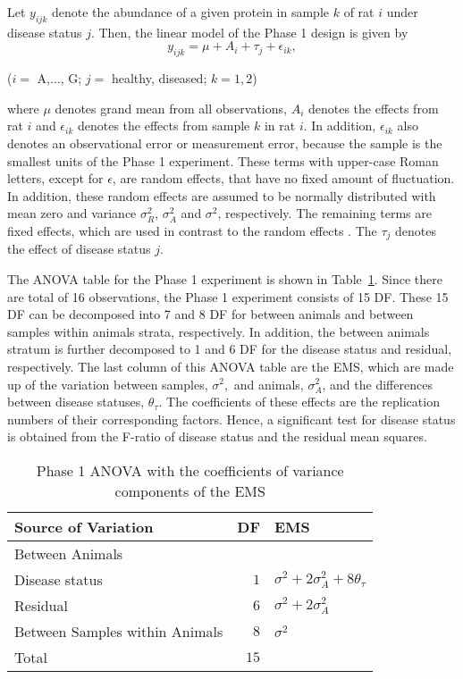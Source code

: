 \documentclass[article]{jss}
\begin{document}
Let $y_{ijk}$ denote the abundance of a given protein in sample $k$ of rat $i$ under disease status $j$. Then, the linear model of the Phase 1 design is given by
\begin{equation}\label{eq:phase1Model}
y_{ijk}= \mu + A_{i} + \tau_{j} + \epsilon_{ik},
\end{equation}
\begin{center}
($i=$ A,$\dots$, G; $j=$ healthy, diseased; $k=1,2$)
\end{center}
where $\mu$ denotes grand mean from all observations, $A_{i}$ denotes the effects from rat $i$ and $\epsilon_{ik}$ denotes the effects from sample $k$ in rat $i$. In addition, $\epsilon_{ik}$ also denotes an observational error or measurement error, because the sample is the smallest units of the Phase 1 experiment. These terms with upper-case Roman letters, except for $\epsilon$, are random effects, that have no fixed amount of fluctuation. In addition, these random effects are assumed to be normally distributed with mean zero and variance $\sigma_{R}^2$, $\sigma_{A}^2$ and $\sigma^2$, respectively. The remaining terms are fixed effects, which are used in contrast to the random effects \citep{Gelman2007}. The $\tau_{j}$ denotes the effect of disease status $j$.

The ANOVA table for the Phase 1 experiment is shown in Table~\ref{tab:Phase1ANOVA}. Since there are total of 16 observations, the Phase 1 experiment consists of 15 DF. These 15 DF can be decomposed into 7 and 8 DF for between animals and between samples within animals strata, respectively. In addition, the between animals stratum is further decomposed to 1 and 6 DF for the disease status and residual, respectively. The last column of this ANOVA table are the EMS, which are made up of the variation between samples, $\sigma^2,$ and animals, $\sigma_{A}^2$, and the differences between disease statuses, $\theta_{\tau}$. The coefficients of these effects are the replication numbers of their corresponding factors. Hence, a significant test for disease status is obtained from the F-ratio of disease status and the residual mean squares.

\begin{table}[ht]
\centering
\caption{Phase 1 ANOVA with the coefficients of variance components of the EMS}
\begin{tabular}[t]{lrl}
\hline
\multicolumn{1}{l}{Source of Variation} & \multicolumn{1}{l}{DF} & \multicolumn{1}{l}{EMS}\\
\hline
Between Animals 		\\
\hspace{3mm}Disease status 			& $1$ 	& $\sigma^2 + 2\sigma_{A}^2 + 8\theta_{\tau}$\\
\hspace{3mm}Residual				& $6$ 	& $\sigma^2 + 2\sigma_{A}^2$\\
Between Samples within Animals		& $8$ 	& $\sigma^2$\\
\hline
Total 								& $15$      & \\
\hline
\end{tabular}
\label{tab:Phase1ANOVA}
\end{table}
\end{document}
